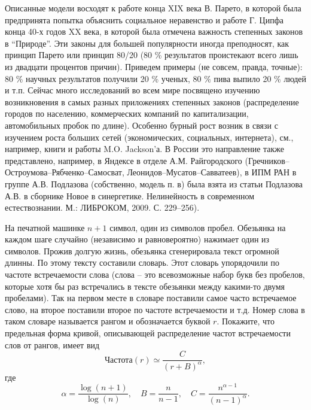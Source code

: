 \begin{problem}
\begin{remark}
 Описанные модели восходят к работе конца XIX века В. 
Парето, в которой была предпринята попытка объяснить социальное неравенство 
и работе Г. Ципфа конца 40-х годов XX века, в которой была отмечена важность 
степенных законов в ``Природе''. Эти законы для большей популярности иногда 
преподносят, как принцип Парето или принцип 80/20 (80 {\%} результатов 
проистекают всего лишь из двадцати процентов причин). Приведем примеры (не 
совсем, правда, точные): 80 {\%} научных результатов получили 20 {\%} 
ученых, 80 {\%} пива выпило 20 {\%} людей и т.п. Сейчас много исследований 
во всем мире посвящено изучению возникновения в самых разных приложениях 
степенных законов (распределение городов по населению, коммерческих компаний 
по капитализации, автомобильных пробок по длине). Особенно бурный рост 
возник в связи с изучением роста больших сетей (экономических, социальных, 
интернета), см., например, книги и работы M.O. Jackson'а. В России это 
направление также представлено, например, в Яндексе в отделе А.М. 
Райгородского (Гречников--Остроумова--Рябченко--Самосват, 
Леонидов--Мусатов--Савватеев), в ИПМ РАН в группе А.В. Подлазова 
(собственно, модель п. в) была взята из статьи Подлазова А.В. в сборнике 
Новое в синергетике. Нелинейность в современном естествознании. М.: 
ЛИБРОКОМ, 2009. С. 229--256).
\end{remark}

\end{problem}

\begin{problem}
На печатной машинке $n+1$ символ, один из символов пробел. Обезьянка на 
каждом шаге случайно (независимо и равновероятно) нажимает один из символов. 
Прожив долгую жизнь, обезьянка сгенерировала текст огромной длинны. По этому 
тексту составили словарь. Этот словарь упорядочили по частоте встречаемости 
слова (слова -- это всевозможные набор букв без пробелов, которые хотя бы 
раз встречались в тексте обезьянки между какими-то двумя пробелами). Так на 
первом месте в словаре поставили самое часто встречаемое слово, на второе 
поставили второе по частоте встречаемости и т.д. Номер слова в таком словаре 
называется рангом и обозначается буквой $r$. Покажите, что предельная форма 
кривой, описывающей распределение частот встречаемости слов от рангов, имеет 
вид
\[
\mbox{Частота}\left( r \right)\simeq \frac{C}{\left( {r+B} \right)^\alpha 
},
\]
где 
\[
\alpha =\frac{\log \left( {n+1} \right)}{\log \left( n \right)},
\quad
B=\frac{n}{n-1},
\quad
C=\frac{n^{\alpha -1}}{\left( {n-1} \right)^\alpha }.
\]
\end{problem}

